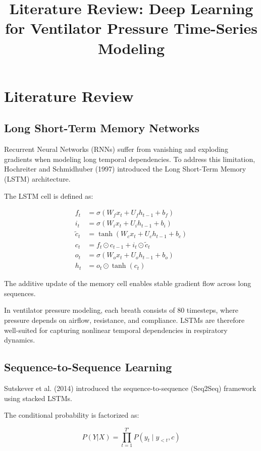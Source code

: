 \documentclass[12pt,a4paper]{report}
\title{Literature Review: Deep Learning for Ventilator Pressure Time-Series Modeling}
\author{}
\date{}
\begin{document}
	
	\maketitle
	
	\chapter*{Literature Review}
	
	\section*{Long Short-Term Memory Networks}
	
	Recurrent Neural Networks (RNNs) suffer from vanishing and exploding gradients when modeling long temporal dependencies. To address this limitation, Hochreiter and Schmidhuber (1997) introduced the Long Short-Term Memory (LSTM) architecture.
	
	The LSTM cell is defined as:
	
	\begin{align}
		f_t &= \sigma(W_f x_t + U_f h_{t-1} + b_f) \\
		i_t &= \sigma(W_i x_t + U_i h_{t-1} + b_i) \\
		\tilde{c}_t &= \tanh(W_c x_t + U_c h_{t-1} + b_c) \\
		c_t &= f_t \odot c_{t-1} + i_t \odot \tilde{c}_t \\
		o_t &= \sigma(W_o x_t + U_o h_{t-1} + b_o) \\
		h_t &= o_t \odot \tanh(c_t)
	\end{align}
	
	The additive update of the memory cell enables stable gradient flow across long sequences.
	
	In ventilator pressure modeling, each breath consists of 80 timesteps, where pressure depends on airflow, resistance, and compliance. LSTMs are therefore well-suited for capturing nonlinear temporal dependencies in respiratory dynamics.
	
	\section*{Sequence-to-Sequence Learning}
	
	Sutskever et al. (2014) introduced the sequence-to-sequence (Seq2Seq) framework using stacked LSTMs.
	
	The conditional probability is factorized as:
	
	\[
	P(Y|X) = \prod_{t=1}^{T'} P(y_t \mid y_{<t}, c)
	\]
	
\end{document}
